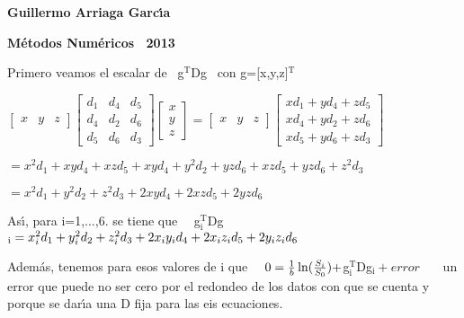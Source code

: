 \documentclass{article}
\begin{document}
\textbf{Guillermo Arriaga Garc\'{\i}a}

\textbf{M\'{e}todos Num\'{e}ricos \ 2013}\bigskip 


Primero veamos el escalar de \ g$^{\text{T}}$Dg \ con g=[x,y,z]$^{\text{T}}$

$\left[ 
\begin{array}{ccc}
x & y & z%
\end{array}%
\right] \left[ 
\begin{array}{ccc}
d_{1} & d_{4} & d_{5} \\ 
d_{4} & d_{2} & d_{6} \\ 
d_{5} & d_{6} & d_{3}%
\end{array}%
\right] \left[ 
\begin{array}{c}
x \\ 
y \\ 
z%
\end{array}%
\right] =\left[ 
\begin{array}{ccc}
x & y & z%
\end{array}%
\right] \left[ 
\begin{array}{c}
xd_{1}+yd_{4}+zd_{5} \\ 
xd_{4}+yd_{2}+zd_{6} \\ 
xd_{5}+yd_{6}+zd_{3}%
\end{array}%
\right] $

$%
=x^{2}d_{1}+xyd_{4}+xzd_{5}+xyd_{4}+y^{2}d_{2}+yzd_{6}+xzd_{5}+yzd_{6}+z^{2}d_{3}
$

$=x^{2}d_{1}+y^{2}d_{2}+z^{2}d_{3}+2xyd_{4}+2xzd_{5}+2yzd_{6}$

\bigskip 

As\'{\i}, para i=1,...,6. se tiene que \ \ g$_{\text{i}}^{\text{T}}$Dg$_{%
\text{i}%
}=x_{i}^{2}d_{1}+y_{i}^{2}d_{2}+z_{i}^{2}d_{3}+2x_{i}y_{i}d_{4}+2x_{i}z_{i}d_{5}+2y_{i}z_{i}d_{6}
$

Adem\'{a}s, tenemos para esos valores de i que \ \  $0=\frac{1}{b}\ln (\frac{%
S_{i}}{S_{0}})+$g$_{\text{i}}^{\text{T}}$Dg$_{\text{i}}+error$ \ \ \ un
error que puede no ser cero por el redondeo de los datos con que se cuenta y
porque se dar\'{\i}a una D fija para las eis ecuaciones.
\end{document}
